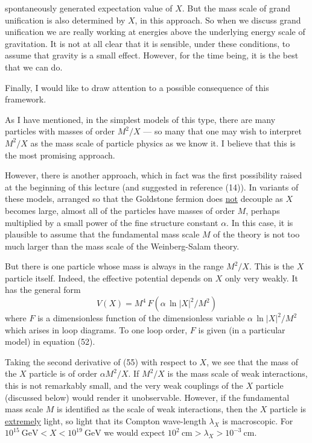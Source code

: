 
spontaneously generated expectation value of $X$. But the mass scale
of grand unification is also determined by $X$, in this approach. So
when we discuss grand unification we are really working at energies
above the underlying energy scale of gravitation. It is not at all
clear that it is sensible, under these conditions, to assume that
gravity is a small effect. However, for the time being, it is the
best that we can do.

Finally, I would like to draw attention to a possible consequence
of this framework.

As I have mentioned, in the simplest models of this type, there
are many particles with masses of order $M^2/X$ --- so many that one may
wish to interpret $M^2/X$ as the mass scale of particle physics as we
know it. I believe that this is the most promising approach.

However, there is another approach, which in fact was the first
possibility raised at the beginning of this lecture (and suggested
in reference (14)). In variants of these models, arranged so that
the Goldstone fermion does \underline{not} decouple as $X$ becomes large, almost
all of the particles have masses of order $M$, perhaps multiplied by a
small power of the fine structure constant $\alpha$. In this case, it is
plausible to assume that the fundamental mass scale $M$ of the theory
is not too much larger than the mass scale of the Weinberg-Salam
theory.

But there is one particle whose mass is always in the range $M^2/X$.
This is the $X$ particle itself. Indeed, the effective potential depends
on $X$ only very weakly. It has the general form
\begin{equation}
V(X) = M^4\, F\left(\alpha\, \ln |X|^2/M^2\right)
\tag{55}
\end{equation}
where $F$ is a dimensionless function of the dimensionless variable
$\alpha\, \ln |X|^2/M^2$ which arises in loop diagrams. To one loop order, $F$ is
given (in a particular model) in equation (52).

Taking the second derivative of (55) with respect to $X$, we see
that the mass of the $X$ particle is of order $\alpha M^2/X$. If $M^2/X$ is the
mass scale of weak interactions, this is not remarkably small, and
the very weak couplings of the $X$ particle (discussed below) would
render it unobservable. However, if the fundamental mass scale $M$
is identified as the scale of weak interactions, then the $X$ particle
is \underline{extremely} light, so light that its Compton wave-length $\lambda_X$ is macroscopic.
For $10^{15}\ \mathrm{GeV} < X < 10^{19}\ \mathrm{GeV}$ we would expect $10^2\ \mathrm{cm} > \lambda_X
> 10^{-3}\ \mathrm{cm}$.

